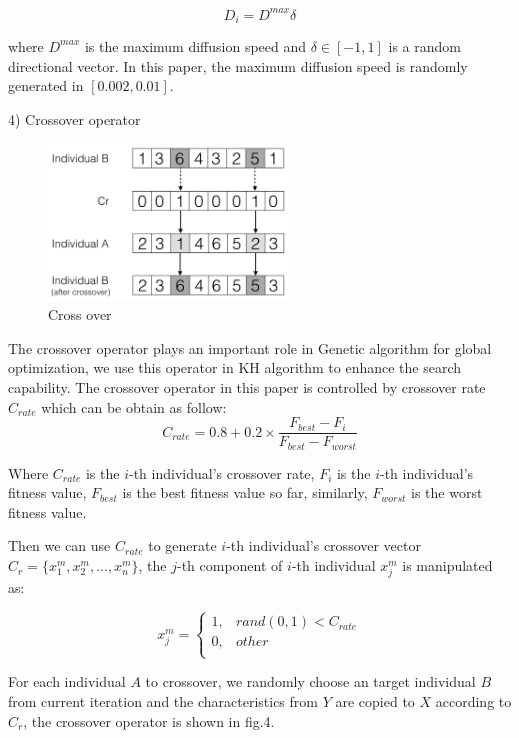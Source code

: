 \documentclass[10pt,journal,compsoc]{IEEEtran}
\begin{document}
\begin{equation}
D_i = D^{max}\delta
\end{equation}

where $D^{max}$ is the maximum diffusion speed and $\delta \in [-1, 1]$ is a random directional vector. In this paper, the maximum diffusion speed is randomly generated in $[0.002, 0.01]$. 

4) Crossover operator

\begin{figure}[!t]
\centering
\includegraphics[width=2.5in]{./img/pic4.png}
\caption{Cross over}
\label{fig_opportunistic}
\end{figure}


The crossover operator plays an important role in Genetic algorithm for global optimization, we use this operator in KH algorithm to enhance the search capability. The crossover operator in this paper is controlled by crossover rate $C_{rate}$ which can be obtain as follow:
\begin{equation}
C_{rate} = 0.8 + 0.2 \times \frac{F_{best}-F_{i}}{F_{best}-F_{worst}}
\end{equation}

Where $C_{rate}$ is the $i$-th individual's crossover rate, $F_{i}$ is the $i$-th individual's fitness value, $F_{best}$ is the best fitness value so far, similarly, $F_{worst}$ is the worst fitness value.

Then we can use $C_{rate}$ to generate $i$-th individual's crossover vector $C_r = \{x_{1}^m,x_{2}^m,...,x_{n}^m\}$, the $j$-th component of $i$-th individual $x_{j}^{m}$ is manipulated as:

\begin{equation}
x_{j}^m=
\begin{cases}
1,& rand(0,1) < C_{rate}\\
0,& other\\
\end{cases}
\end{equation}

For each individual $A$ to crossover, we randomly choose an target individual $B$ from current iteration and the characteristics from $Y$ are copied to $X$ according to $C_r$, the crossover operator is shown in fig.4.
\end{document}
